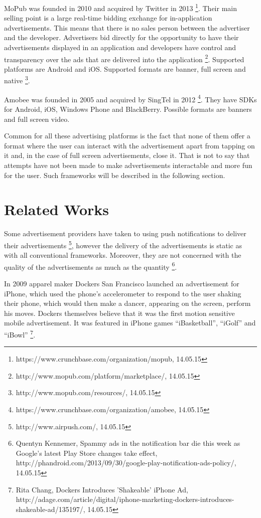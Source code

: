 MoPub was founded in 2010 and acquired by Twitter in 2013 \footnote[27]{https://www.crunchbase.com/organization/mopub, 14.05.15}. Their main selling point is a large real-time bidding exchange for in-application advertisements. This means that there is no sales person between the advertiser and the developer. Advertisers bid directly for the opportunity to have their advertisements displayed in an application and developers have  control and transparency over the ads that are delivered into the application \footnote[28]{http://www.mopub.com/platform/marketplace/, 14.05.15}. Supported platforms are Android and iOS. Supported formats are banner, full screen and native \footnote[29]{http://www.mopub.com/resources/, 14.05.15}.

Amobee was founded in 2005 and acquired by SingTel in 2012 \footnote[30]{https://www.crunchbase.com/organization/amobee, 14.05.15}. They have SDKs for Android, iOS, Windows Phone and BlackBerry. Possible formats are banners and full screen video.

Common for all these advertising platforms is the fact that none of them offer a format where the user can interact with the advertisement apart from tapping on it and, in the case of full screen advertisements, close it. That is not to say that attempts have not been made to make advertisements interactable and more fun for the user. Such frameworks will be described in the following section.

\section{Related Works}

Some advertisement providers have taken to using push notifications to deliver their advertisements \footnote[31]{http://www.airpush.com/, 14.05.15}, however the delivery of the advertisements is static as with all conventional frameworks. Moreover, they are not concerned with the quality of the advertisements as much as the quantity \footnote[32]{Quentyn Kennemer, Spammy ads in the notification bar die this week as Google’s latest Play Store changes take effect, http://phandroid.com/2013/09/30/google-play-notification-ads-policy/, 14.05.15}.

In 2009 apparel maker Dockers San Francisco launched an advertisement for iPhone, which used the phone's accelerometer to respond to the user shaking their phone, which would then make a dancer, appearing on the screen, perform his moves. Dockers themselves believe that it was the first motion sensitive mobile advertisement. It was featured in iPhone games “iBasketball”, “iGolf” and “iBowl” \footnote[33]{Rita Chang, Dockers Introduces 'Shakeable' iPhone Ad, http://adage.com/article/digital/iphone-marketing-dockers-introduces-shakeable-ad/135197/, 14.05.15}.

